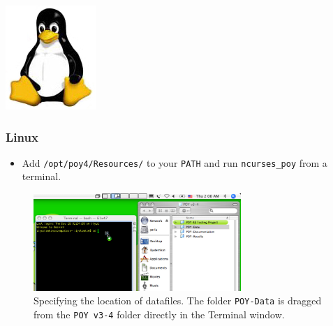\begin{flushleft}
	\begin{minipage}[c]{0.075\textwidth}
   		\includegraphics[width=\textwidth]{figures/figlogolinux.jpg}
	\end{minipage}
	\quad
	\begin{minipage}[t]{0.89\textwidth}
	   	\subsubsection{Linux}
	\end{minipage}
	\begin{itemize}
    		\item Add \texttt{/opt/poy4/Resources/} to your \texttt{PATH} and run
    \texttt{ncurses\_poy} from a terminal.
    	\end{itemize}
\end{flushleft}

\begin{figure}[htbp]
   \centering
   \includegraphics[width=0.7\textwidth]{figures/figprelim1.jpg}
   \caption{Specifying the location of datafiles. The folder \texttt{POY-Data} is dragged from the \texttt{POY v3-4} folder directly in the Terminal window.}
   \label{fig:figprelim1}
\end{figure}

